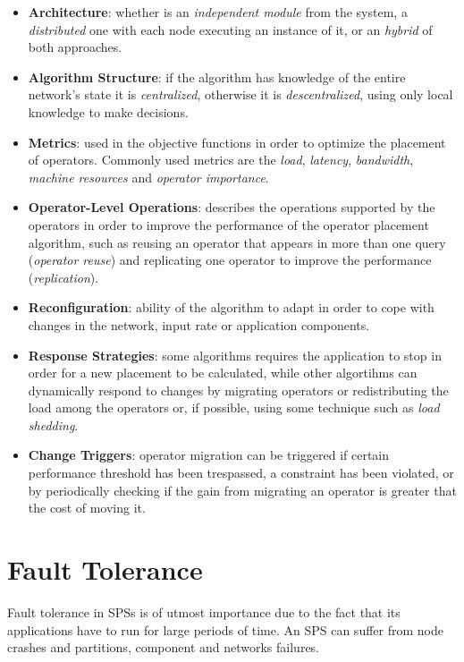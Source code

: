 \documentclass[ppgc,diss,english]{iiufrgs}
\begin{document}
\begin{itemize}
    \item \textbf{Architecture}: whether is an \emph{independent module} from the system, a \emph{distributed} one with each node executing an instance of it, or an \emph{hybrid} of both approaches.
    \item \textbf{Algorithm Structure}: if the algorithm has knowledge of the entire network's state it is \emph{centralized}, otherwise it is \emph{descentralized}, using only local knowledge to make decisions.
    \item \textbf{Metrics}: used in the objective functions in order to optimize the placement of operators. Commonly used metrics are the \emph{load}, \emph{latency}, \emph{bandwidth}, \emph{machine resources} and \emph{operator importance}.
    \item \textbf{Operator-Level Operations}: describes the operations supported by the operators in order to improve the performance of the operator placement algorithm, such as reusing an operator that appears in more than one query (\emph{operator reuse}) and replicating one operator to improve the performance (\emph{replication}).
    \item \textbf{Reconfiguration}: ability of the algorithm to adapt in order to cope with changes in the network, input rate or application components.
    \item \textbf{Response Strategies}: some algorithms requires the application to stop in order for a new placement to be calculated, while other algortihms can dynamically respond to changes by migrating operators or redistributing the load among the operators or, if possible, using some technique such as \emph{load shedding}.
    \item \textbf{Change Triggers}: operator migration can be triggered if certain performance threshold has been trespassed, a constraint has been violated, or by periodically checking if the gain from migrating an operator is greater that the cost of moving it.
\end{itemize}

\section{Fault Tolerance}
\label{sec:esp:fault_tolerance}

Fault tolerance in SPSs is of utmost importance due to the fact that its applications have to run for large periods of time. An SPS can suffer from node crashes and partitions, component and networks failures.
\end{document}
